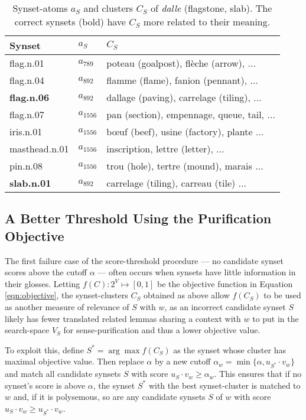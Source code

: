 \documentclass{book}
\begin{document}
\begin{table*}[ht]
\centering
\begin{tabular}{@{}lll@{}}
Synset & $a_S$ & $C_S$ \\
\toprule
flag.n.01 & $a_{789}$ & poteau (goalpost), flèche (arrow), $\dots$ \\
flag.n.04 & $a_{892}$ & flamme (flame), fanion (pennant), $\dots$ \\
{\bf flag.n.06} & $a_{892}$ & dallage (paving), carrelage (tiling), $\dots$ \\
flag.n.07 & $a_{1556}$ & pan (section), empennage, queue, tail, $\dots$ \\
iris.n.01 & $a_{1556}$ & bœuf (beef), usine (factory), plante $\dots$ \\
masthead.n.01 & $a_{1556}$ & inscription, lettre (letter), $\dots$ \\
pin.n.08 & $a _{1556}$& trou (hole), tertre (mound), marais $\dots$ \\
{\bf slab.n.01} & $a_{892}$ & carrelage (tiling), carreau (tile) $\dots$ \\
\bottomrule
\end{tabular}
\caption{\label{tbl:clusters} Synset-atoms $a_S$ and clusters $C_S$ of {\em dalle} (flagstone, slab). The correct synsets (bold) have $C_S$ more related to their meaning.}
\end{table*}

\subsection{A Better Threshold Using the Purification Objective}
\label{subsec:better}

The first failure case of the score-threshold procedure --- no candidate synset scores above the cutoff $\alpha$ --- often occurs when synsets have little information in their glosses.
Letting $f(C):2^V\mapsto[0,1]$ be the objective function in Equation \ref{eqn:objective}, the synset-clusters $C_S$ obtained as above allow $f(C_S)$ to be used as another measure of relevance of $S$ with $w$, as an incorrect candidate synset $S$ likely has fewer translated related lemmas sharing a context with $w$ to put in the search-space $V_S$ for sense-purification and thus a lower objective value.

To exploit this, define $S^*=\arg\max f(C_S)$ as the synset whose cluster has maximal objective value.
Then replace $\alpha$ by a new cutoff $\alpha_w=\min\{\alpha,u_{S^*}\cdot v_w\}$ and match all candidate synsets $S$ with score $u_S\cdot v_w\ge\alpha_w$.
This ensures that if no synset's score is above $\alpha$, the synset $S^*$ with the best synset-cluster is matched to $w$ and, if it is polysemous, so are any candidate synsets $S$ of $w$ with score $u_S\cdot v_w\ge u_{S^*}\cdot v_w$.
\end{document}
